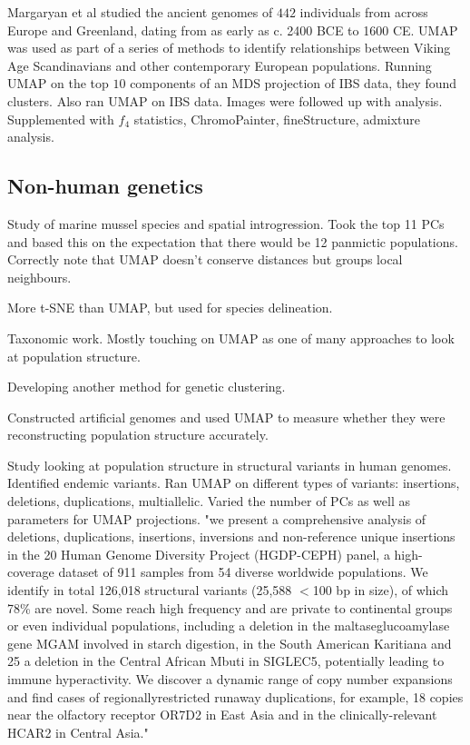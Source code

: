 \documentclass[12pt]{article}
\begin{document}
Margaryan et al\cite{margaryan_population_2019} studied the ancient genomes of $442$ individuals from across Europe and Greenland, dating from as early as c. 2400 BCE to 1600 CE. UMAP was used as part of a series of methods to identify relationships between Viking Age Scandinavians and other contemporary European populations. Running UMAP on the top $10$ components of an MDS projection of IBS data, they found clusters. Also ran UMAP on IBS data. Images were followed up with analysis. Supplemented with $f_4$ statistics, ChromoPainter, fineStructure, admixture analysis.

\subsection*{Non-human genetics}

Study of marine mussel species and spatial introgression. Took the top 11 PCs and based this on the expectation that there would be 12 panmictic populations. Correctly note that UMAP doesn't conserve distances but groups local neighbours.\cite{simon_local_2019}

More t-SNE than UMAP, but used for species delineation.\cite{derkarabetian_demonstration_2019}

Taxonomic work. Mostly touching on UMAP as one of many approaches to look at population structure. \cite{greenbaum_network-based_2019}

Developing another method for genetic clustering.\cite{tonkin-hill_fast_2019}

Constructed artificial genomes and used UMAP to measure whether they were reconstructing population structure accurately.\cite{yelmen_creating_2019}

Study looking at population structure in structural variants in human genomes. Identified endemic variants. Ran UMAP on different types of variants: insertions, deletions, duplications, multiallelic. Varied the number of PCs as well as parameters for UMAP projections. "we present a comprehensive analysis of
deletions, duplications, insertions, inversions and non-reference unique insertions in the
20 Human Genome Diversity Project (HGDP-CEPH) panel, a high-coverage dataset of 911
samples from 54 diverse worldwide populations. We identify in total 126,018 structural variants
(25,588 $<$100 bp in size), of which 78\% are novel. Some reach high frequency and are private
to continental groups or even individual populations, including a deletion in the maltaseglucoamylase
gene MGAM involved in starch digestion, in the South American Karitiana and
25 a deletion in the Central African Mbuti in SIGLEC5, potentially leading to immune hyperactivity.
We discover a dynamic range of copy number expansions and find cases of regionallyrestricted
runaway duplications, for example, 18 copies near the olfactory receptor OR7D2 in
East Asia and in the clinically-relevant HCAR2 in Central Asia."\cite{almarri_population_2020}
\end{document}
